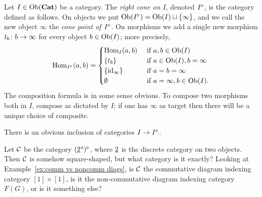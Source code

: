 \documentclass[CT4S-EN-RU]{subfiles}
\begin{document}
\begin{definitionENG}\label{def:rcone}
Let $I\in\textnormal{Ob}({\mathbf{Cat}})$ be a category. The {\em right cone on $I$}, denoted $I^\triangleright$, is the category defined as follows. On objects we put $\textnormal{Ob}(I^\triangleright)=\textnormal{Ob}(I)\sqcup\{\infty\}$, and we call the new object $\infty$ the {\em cone point of $I^\triangleright$}. On morphisms we add a single new morphism $t_b\colon b\rightarrow\infty$ for every object $b\in \textnormal{Ob}(I)$; more precisely,
$$\textnormal{Hom}_{I^\triangleright}(a,b)=
\begin{cases}
\textnormal{Hom}_I(a,b)&\textnormal{ if }a,b\in\textnormal{Ob}(I)\\
\{t_b\}&\textnormal{ if }a\in\textnormal{Ob}(I), b=\infty\\
\{\textnormal{id}_{\infty}\}&\textnormal{ if } a=b=\infty\\
\emptyset&\textnormal{ if } a=\infty,b\in\textnormal{Ob}(I).
\end{cases}$$
The composition formula is in some sense obvious. To compose two morphisms both in $I$, compose as dictated by $I$; if one has $\infty$ as target then there will be a unique choice of composite.

There is an obvious inclusion of categories $I\rightarrow I^\triangleright$.
\end{definitionENG}

\begin{definitionRUS}\label{def:rcone}
\end{definitionRUS}

\begin{exerciseENG}
Let $\mathcal{C}$ be the category $(\underline{2}^\triangleleft)^\triangleright$, where $\underline{2}$ is the discrete category on two objects. Then $\mathcal{C}$ is somehow square-shaped, but what category is it exactly? Looking at Example~\ref{ex:comm vs noncomm diags}, is $\mathcal{C}$ the commutative diagram indexing category $[1]\times[1]$, is it the non-commutative diagram indexing category $F(G)$, or is it something else?
\end{exerciseENG}

\begin{exerciseRUS}
\end{exerciseRUS}


\subsection{}\label{sec:lims and colims in a cat}
\end{document}
